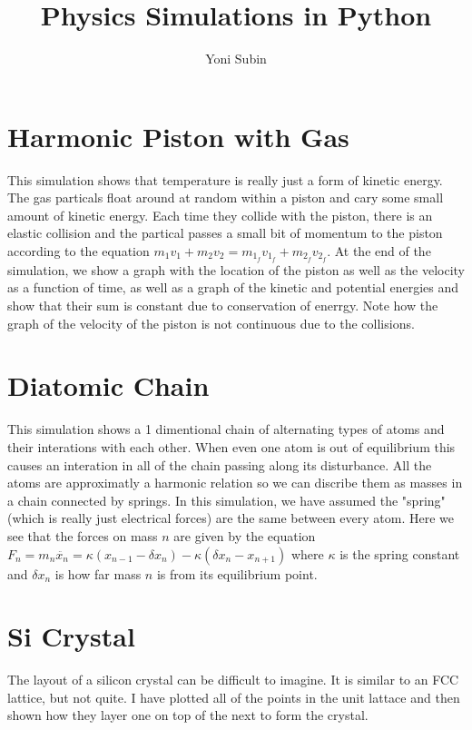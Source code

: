 \documentclass{article}
\author{Yoni Subin}
\begin{document}
    \title{Physics Simulations in Python}
    \maketitle
    \section*{Harmonic Piston with Gas}
    This simulation shows that temperature is really just a form of kinetic energy.
    The gas particals float around at random within a piston and cary some small
    amount of kinetic energy. Each time they collide with the piston,
    there is an elastic collision and the partical passes a small bit of momentum
    to the piston according to the equation 
    $m_1v_1+m_2v_2=m_{1_f}v_{1_f}+m_{2_f}v_{2_f}$. At the end of the simulation,
    we show a graph with the location of the piston as well as the velocity 
    as a function of time, as well as a graph of the kinetic and potential 
    energies and show that their sum is constant due to conservation of enerrgy.
    Note how the graph of the velocity of the piston is not continuous due to 
    the collisions.
    \section*{Diatomic Chain}
    This simulation shows a 1 dimentional chain of alternating types of atoms and
    their interations with each other. When even one atom is out of equilibrium 
    this causes an interation in all of the chain passing along its disturbance.
    All the atoms are approximatly a harmonic relation so we can discribe them as 
    masses in a chain connected by springs. In this simulation, we have assumed the 
    "spring" (which is really just electrical forces) are the same between every atom. 
    Here we see that the forces on mass $n$ are given by the equation 
    $F_n=m_n\ddot{x_n}=\kappa\left(x_{n-1}-\delta x_n\right)-\kappa\left(\delta x_n - x_{n+1}\right)$
    where $\kappa$ is the spring constant and $\delta x_n$ is how far mass $n$ is
    from its equilibrium point.
    \section*{Si Crystal}
    The layout of a silicon crystal can be difficult to imagine. It is similar to an FCC
    lattice, but not quite. I have plotted all of the points in the unit 
    lattace and then shown how they layer one on top of the next to form the crystal.
\end{document}
